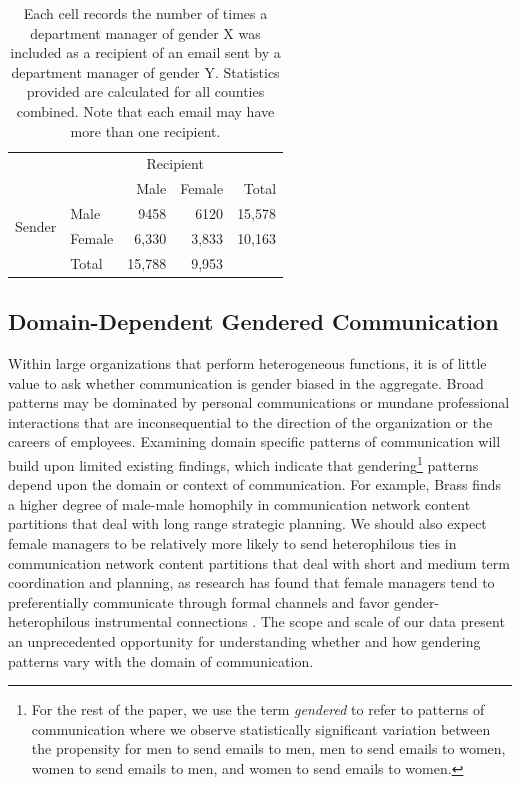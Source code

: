 \documentclass{pnastwo}
\begin{document}
\begin{article}
	\begin{table}
	\centering
	\begin{tabular}{rlrrr}
	  \toprule
		 && \multicolumn{2}{c}{Recipient} \\
		\cmidrule{3-4}
	& & Male & Female & Total  \\
		 \midrule
		\multirow{2}{*}{Sender} & Male &  9458 & 6120  & 15,578 \\
	& Female & 6,330 & 3,833 & 10,163 \\
	\midrule
		 & Total & 15,788 & 9,953 & \\
		\bottomrule
		\end{tabular}
		\caption{\label{tab:gender email agg stats}Each cell records the number of times a department manager of gender X was included as a recipient of an email sent by a department manager of gender Y. Statistics provided are calculated for all counties combined. Note that each email may have more than one recipient.}
	\end{table}

\subsection{Domain-Dependent Gendered Communication}
Within large organizations that perform heterogeneous functions, it is of little value to ask whether communication is gender biased in the aggregate. Broad patterns may be dominated by personal communications or mundane professional interactions that are inconsequential to the direction of the organization or the careers of employees. Examining domain specific patterns of communication will build upon limited existing findings, which indicate that gendering\footnote{For the rest of the paper, we use the term \emph{gendered} to refer to patterns of communication where we observe statistically significant variation between the propensity for men to send emails to men, men to send emails to women, women to send emails to men, and women to send emails to women.} patterns depend upon the domain or context of communication. For example, Brass \citep{Brass1985} finds a higher degree of male-male homophily in communication network content partitions that deal with long range strategic planning. We should also expect female managers to be relatively more likely to send heterophilous ties in communication network content partitions that deal with short and medium term coordination and planning, as research has found that female managers tend to preferentially communicate through formal channels  \citep{Ragins1989} and favor gender-heterophilous instrumental connections \citep{Ibarra1992}. The scope and scale of our data present an unprecedented opportunity for understanding whether and how gendering patterns vary with the domain of communication.


\end{article}
\end{document}
